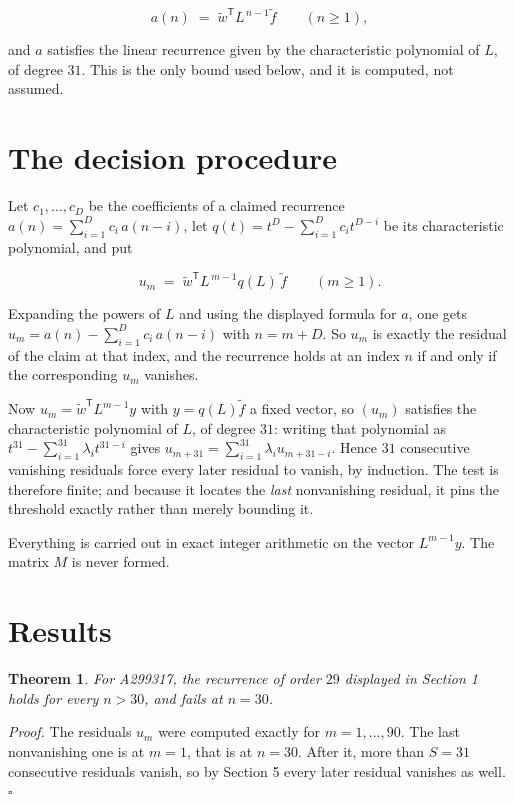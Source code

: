 \documentclass[11pt]{article}
\newtheorem{theorem}{Theorem}
\theoremstyle{definition}
\begin{document}
\[a(n) \;=\; \tilde w^{\mathsf T} L^{\,n-1} \tilde f \qquad (n \ge 1),\]

and $a$ satisfies the linear recurrence given by the characteristic polynomial of $L$, of degree $31$. This is the only bound used below, and it is computed, not assumed.

\section{The decision procedure}

Let $c_1,\dots,c_D$ be the coefficients of a claimed recurrence $a(n) = \sum_{i=1}^{D} c_i\,a(n-i)$, let $q(t) = t^{D} - \sum_{i=1}^{D} c_i t^{D-i}$ be its characteristic polynomial, and put

\[u_m \;=\; \tilde w^{\mathsf T} L^{\,m-1} q(L)\,\tilde f \qquad (m \ge 1).\]

Expanding the powers of $L$ and using the displayed formula for $a$, one gets $u_m = a(n) - \sum_{i=1}^{D} c_i\,a(n-i)$ with $n = m + D$. So $u_m$ is exactly the residual of the claim at that index, and the recurrence holds at an index $n$ if and only if the corresponding $u_m$ vanishes.

Now $u_m = \tilde w^{\mathsf T} L^{m-1} y$ with $y = q(L)\tilde f$ a fixed vector, so $(u_m)$ satisfies the characteristic polynomial of $L$, of degree $31$: writing that polynomial as $t^{31} - \sum_{i=1}^{31} \lambda_i t^{31-i}$ gives $u_{m+31} = \sum_{i=1}^{31} \lambda_i u_{m+31-i}$. Hence $31$ consecutive vanishing residuals force every later residual to vanish, by induction. The test is therefore finite; and because it locates the {\itshape last} nonvanishing residual, it pins the threshold exactly rather than merely bounding it.

Everything is carried out in exact integer arithmetic on the vector $L^{m-1}y$. The matrix $M$ is never formed.

\section{Results}

\begin{theorem} For A299317, the recurrence of order $29$ displayed in Section 1 holds for every $n > 30$, and fails at $n = 30$.\end{theorem}

{\itshape Proof.} The residuals $u_m$ were computed exactly for $m = 1,\dots,90$. The last nonvanishing one is at $m = 1$, that is at $n = 30$. After it, more than $S = 31$ consecutive residuals vanish, so by Section 5 every later residual vanishes as well. $\square$
\end{document}
